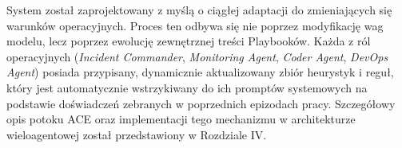 System został zaprojektowany z myślą o ciągłej adaptacji do zmieniających się warunków operacyjnych. Proces ten odbywa się nie poprzez modyfikację wag modelu, lecz poprzez ewolucję zewnętrznej treści Playbooków. Każda z ról operacyjnych (\textit{Incident Commander}, \textit{Monitoring Agent}, \textit{Coder Agent}, \textit{DevOps Agent}) posiada przypisany, dynamicznie aktualizowany zbiór heurystyk i reguł, który jest automatycznie wstrzykiwany do ich promptów systemowych na podstawie doświadczeń zebranych w poprzednich epizodach pracy. Szczegółowy opis potoku ACE oraz implementacji tego mechanizmu w architekturze wieloagentowej został przedstawiony w Rozdziale IV.



